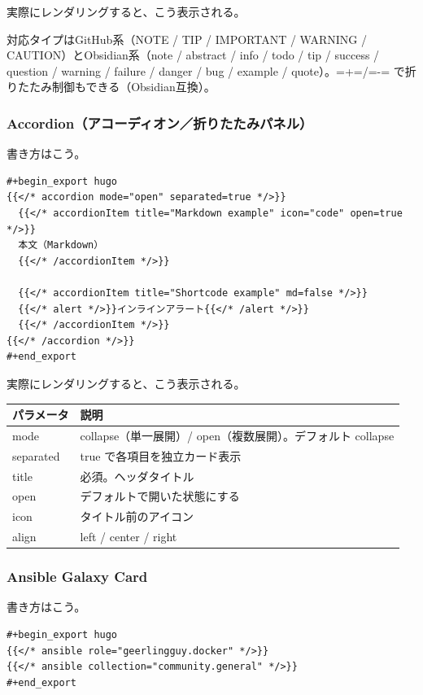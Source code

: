 \documentclass[11pt]{article}
\begin{document}
実際にレンダリングすると、こう表示される。

対応タイプはGitHub系（NOTE / TIP / IMPORTANT / WARNING / CAUTION）とObsidian系（note / abstract / info / todo / tip / success / question / warning / failure / danger / bug / example / quote）。=+=/=-= で折りたたみ制御もできる（Obsidian互換）。
\subsubsection{Accordion（アコーディオン／折りたたみパネル）}
\label{sec:orga2c0171}

書き方はこう。

\begin{verbatim}
#+begin_export hugo
{{</* accordion mode="open" separated=true */>}}
  {{</* accordionItem title="Markdown example" icon="code" open=true */>}}
  本文（Markdown）
  {{</* /accordionItem */>}}

  {{</* accordionItem title="Shortcode example" md=false */>}}
  {{</* alert */>}}インラインアラート{{</* /alert */>}}
  {{</* /accordionItem */>}}
{{</* /accordion */>}}
#+end_export
\end{verbatim}

実際にレンダリングすると、こう表示される。

\begin{center}
\begin{tabular}{ll}
パラメータ & 説明\\
\hline
mode & collapse（単一展開）/ open（複数展開）。デフォルト collapse\\
separated & true で各項目を独立カード表示\\
title & 必須。ヘッダタイトル\\
open & デフォルトで開いた状態にする\\
icon & タイトル前のアイコン\\
align & left / center / right\\
\end{tabular}
\end{center}
\subsubsection{Ansible Galaxy Card}
\label{sec:org8df0471}

書き方はこう。

\begin{verbatim}
#+begin_export hugo
{{</* ansible role="geerlingguy.docker" */>}}
{{</* ansible collection="community.general" */>}}
#+end_export
\end{verbatim}
\end{document}

